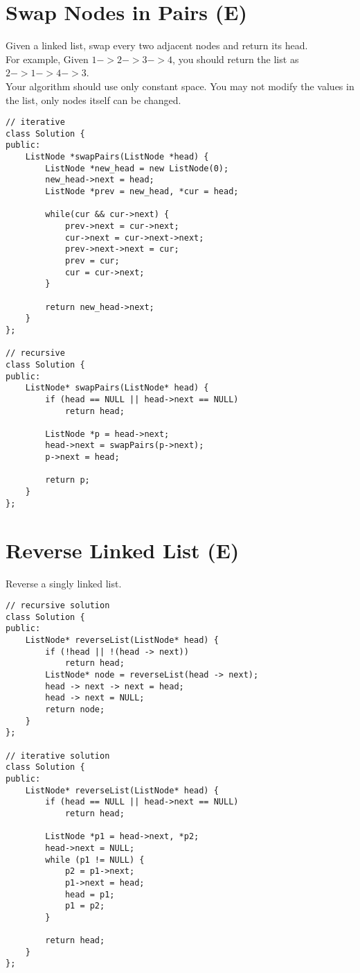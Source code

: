 \section{Swap Nodes in Pairs (E)}
Given a linked list, swap every two adjacent nodes and return its head. \\

For example, Given $1->2->3->4$, you should return the list as $2->1->4->3$. \\

Your algorithm should use only constant space. You may not modify the values in the list, only nodes itself can be changed. \\

\begin{lstlisting}
// iterative
class Solution {
public:
    ListNode *swapPairs(ListNode *head) {
        ListNode *new_head = new ListNode(0);
        new_head->next = head;
        ListNode *prev = new_head, *cur = head;
        
        while(cur && cur->next) {
            prev->next = cur->next;
            cur->next = cur->next->next;
            prev->next->next = cur;
            prev = cur;
            cur = cur->next;
        }
        
        return new_head->next;
    }
};

// recursive
class Solution {
public:
    ListNode* swapPairs(ListNode* head) {
        if (head == NULL || head->next == NULL)
            return head;
        
        ListNode *p = head->next;
        head->next = swapPairs(p->next);
        p->next = head;
        
        return p;
    }
};
\end{lstlisting}


\section{Reverse Linked List (E)}
Reverse a singly linked list.\\

\begin{lstlisting}
// recursive solution
class Solution {
public:   
    ListNode* reverseList(ListNode* head) {
        if (!head || !(head -> next)) 
            return head;
        ListNode* node = reverseList(head -> next);
        head -> next -> next = head;
        head -> next = NULL;
        return node; 
    }
}; 

// iterative solution
class Solution {
public:
    ListNode* reverseList(ListNode* head) {
        if (head == NULL || head->next == NULL)
            return head;
            
        ListNode *p1 = head->next, *p2;
        head->next = NULL;
        while (p1 != NULL) {
            p2 = p1->next;
            p1->next = head;
            head = p1;
            p1 = p2;
        }
        
        return head;
    }
};
\end{lstlisting} 



